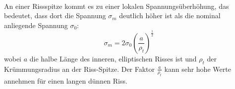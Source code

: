 \documentclass[11pt,a4paper]{article}
\numberwithin{equation}{section}
\numberwithin{figure}{section}
\begin{document}
\\
\begin{addmargin}[25pt]{0pt}
An einer Rissspitze kommt es zu einer lokalen Spannungsüberhöhung, das bedeutet, dass dort die Spannung $\sigma_m$ deutlich höher ist als die nominal anliegende Spannung $\sigma_0$:
\begin{equation}\label{eq:Spannung_Rissspitze}
\sigma_m = 2\sigma_0 \left( \frac{a}{\rho_t}\right)^\frac{1}{2}
\end{equation}
wobei $a$ die halbe Länge des inneren, elliptischen Risses ist und $\rho_t$ der Krümmungsradius an der Riss-Spitze. Der Faktor $\frac{a}{\rho_t}$ kann sehr hohe Werte annehmen für einen langen dünnen Riss.\\
\end{addmargin}
\end{document}
